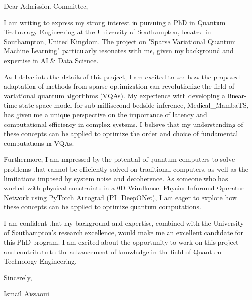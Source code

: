 \documentclass{letter}
\begin{document}
\opening{Dear Admission Committee,}

I am writing to express my strong interest in pursuing a PhD in Quantum Technology Engineering at the University of Southampton, located in Southampton, United Kingdom. The project on "Sparse Variational Quantum Machine Learning" particularly resonates with me, given my background and expertise in AI & Data Science.

As I delve into the details of this project, I am excited to see how the proposed adaptation of methods from sparse optimization can revolutionize the field of variational quantum algorithms (VQAs). My experience with developing a linear-time state space model for sub-millisecond bedside inference, Medical_MambaTS, has given me a unique perspective on the importance of latency and computational efficiency in complex systems. I believe that my understanding of these concepts can be applied to optimize the order and choice of fundamental computations in VQAs.

Furthermore, I am impressed by the potential of quantum computers to solve problems that cannot be efficiently solved on traditional computers, as well as the limitations imposed by system noise and decoherence. As someone who has worked with physical constraints in a 0D Windkessel Physics-Informed Operator Network using PyTorch Autograd (PI_DeepONet), I am eager to explore how these concepts can be applied to optimize quantum computations.

I am confident that my background and expertise, combined with the University of Southampton's research excellence, would make me an excellent candidate for this PhD program. I am excited about the opportunity to work on this project and contribute to the advancement of knowledge in the field of Quantum Technology Engineering.

\closing{Sincerely,}

Ismaïl Aïssaoui
\end{document}
